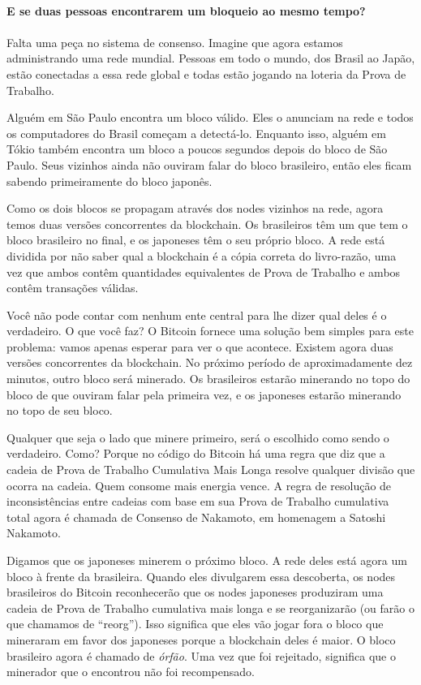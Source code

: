 \paragraph{E se duas pessoas encontrarem um bloqueio ao mesmo tempo?}
\paragraph{}

Falta uma peça no sistema de consenso. Imagine que agora estamos administrando uma rede mundial. Pessoas em todo o mundo, dos Brasil ao Japão, estão conectadas a essa rede global e todas estão jogando na loteria da Prova de Trabalho.

Alguém em São Paulo encontra um bloco válido. Eles o anunciam na rede e todos os computadores do Brasil começam a detectá-lo. Enquanto isso, alguém em Tókio também encontra um bloco a poucos segundos depois do bloco de São Paulo. Seus vizinhos ainda não ouviram falar do bloco brasileiro, então eles ficam sabendo primeiramente do bloco japonês.

Como os dois blocos se propagam através dos nodes vizinhos na rede, agora temos duas versões concorrentes da blockchain. Os brasileiros têm um que tem o bloco brasileiro no final, e os japoneses têm o seu próprio bloco. A rede está dividida por não saber qual a blockchain é a cópia correta do livro-razão, uma vez que ambos contêm quantidades equivalentes de Prova de Trabalho e ambos contêm transações válidas.

Você não pode contar com nenhum ente central para lhe dizer qual deles é o verdadeiro. O que você faz? O Bitcoin fornece uma solução bem simples para este problema: vamos apenas esperar para ver o que acontece. Existem agora duas versões concorrentes da blockchain. No próximo período de aproximadamente dez minutos, outro bloco será minerado. Os brasileiros estarão minerando no topo do bloco de que ouviram falar pela primeira vez, e os japoneses estarão minerando no topo de seu bloco.

Qualquer que seja o lado que minere primeiro, será o escolhido como sendo o verdadeiro. Como? Porque no código do Bitcoin há uma regra que diz que a cadeia de Prova de Trabalho Cumulativa Mais Longa resolve qualquer divisão que ocorra na cadeia. Quem consome mais energia vence. A regra de resolução de inconsistências entre cadeias com base em sua Prova de Trabalho cumulativa total agora é chamada de Consenso de Nakamoto, em homenagem a Satoshi Nakamoto.

Digamos que os japoneses minerem o próximo bloco. A rede deles está agora um bloco à frente da brasileira. Quando eles divulgarem essa descoberta, os nodes brasileiros do Bitcoin reconhecerão que os nodes japoneses produziram uma cadeia de Prova de Trabalho cumulativa mais longa e se reorganizarão (ou farão o que chamamos de “reorg”). Isso significa que eles vão jogar fora o bloco que mineraram em favor dos japoneses porque a blockchain deles é maior. O bloco brasileiro agora é chamado de \textit{órfão}. Uma vez que foi rejeitado, significa que o minerador que o encontrou não foi recompensado.

